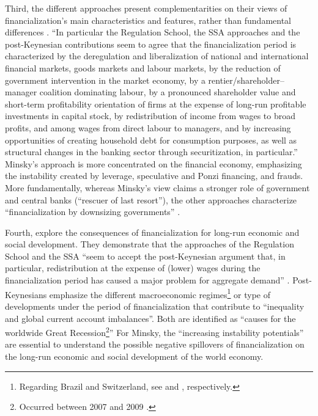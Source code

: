 \documentclass[a4paper, twoside]{templates/ociamthesis}
\begin{document}
Third, the different approaches present complementarities on their views of financialization's main characteristics and features, rather than fundamental differences \autocite{hein2015c}. ``In particular the Regulation School, the SSA approaches and the post-Keynesian contributions seem to agree that the financialization period is characterized by the deregulation and liberalization of national and international financial markets, goods markets and labour markets, by the reduction of government intervention in the market economy, by a rentier/shareholder--manager coalition dominating labour, by a pronounced shareholder value and short-term profitability orientation of firms at the expense of long-run profitable investments in capital stock, by redistribution of income from wages to broad profits, and among wages from direct labour to managers, and by increasing opportunities of creating household debt for consumption purposes, as well as structural changes in the banking sector through securitization, in particular.'' \autocite[ 44-45]{hein2015c} Minsky's approach is more concentrated on the financial economy, emphasizing the instability created by leverage, speculative and Ponzi financing, and frauds. More fundamentally, whereas Minsky's view claims a stronger role of government and central banks (``rescuer of last resort''), the other approaches characterize ``financialization by downsizing governments'' \autocite[ 45]{hein2015c}.

Fourth, \textcite{hein2015c} explore the consequences of financialization for long-run economic and social development. They demonstrate that the approaches of the Regulation School and the SSA ``seem to accept the post-Keynesian argument that, in particular, redistribution at the expense of (lower) wages during the financialization period has caused a major problem for aggregate demand'' \autocite[ 45]{hein2015c}. Post-Keynesians emphasize the different macroeconomic regimes\footnote{Regarding Brazil and Switzerland, see \textcite{hartwig2013} and \textcite{tomio2020a}, respectively.} or type of developments under the period of financialization that contribute to ``inequality and global current account imbalances''. Both are identified as ``causes for the worldwide Great Recession\footnote{Occurred between 2007 and 2009 \autocite{maclean2015}.}'' \autocite[ 45]{hein2015c} For Minsky, the ``increasing instability potentials'' \autocite[ 46]{hein2015c} are essential to understand the possible negative spillovers of financialization on the long-run economic and social development of the world economy.
\end{document}
